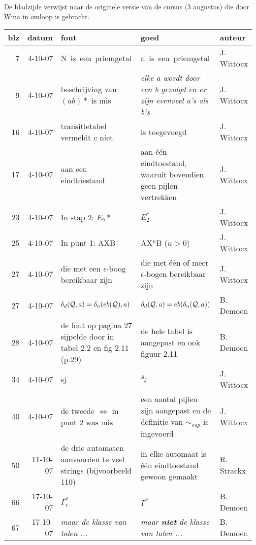 \documentclass[11pt]{fund}
\renewcommand{\thepage}{\hspace*{-3cm}\arabic{page}}
\begin{document}
\renewcommand{\thepage}{}


\renewcommand{\thepage}{\arabic{page}}
De bladzijde verwijst naar de originele versie van de cursus (3
augustus) die door Wina in omloop is gebracht.


\begin{tabular}{|r|r|p{6cm}|p{6cm}|p{2cm}|}
\hline
blz & datum    & fout & goed  & auteur \\ \hline
\hline
7 & 4-10-07 & N~is~een~priemgetal  & n~is~een~priemgetal  & J. Wittocx    \\
\hline
9 & 4-10-07 & beschrijving van $(ab)*$ is mis    & {\em elke a wordt door een b gevolgd en er zijn evenveel a's als b's}                     & J. Wittocx    \\
\hline
16 & 4-10-07 & transitietabel vermeldt c niet  &  is toegevoegd                     & J. Wittocx    \\
\hline
17 & 4-10-07 & aan een eindtoestand &  aan \'e\'en eindtoestand, waaruit bovendien geen pijlen vertrekken                    & J. Wittocx    \\
\hline
23 & 4-10-07 &  In stap 2: $E_2*$ &  $E_2^*$                       & J. Wittocx    \\
\hline
25 & 4-10-07 & In punt 1: AXB   & AX$^n$B ($n>0$)   & J. Wittocx    \\
\hline
27 & 4-10-07 & die met een $\epsilon$-boog bereikbaar zijn & die met \'{e}\'{e}n of meer $\epsilon$-bogen bereikbaar zijn & J. Wittocx    \\
\hline
27 & 4-10-07 & $\delta_d({\cal Q},a) = \delta_n(eb({\cal Q}),a)$  & $\delta_d({\cal Q},a) = eb(\delta_n({\cal Q},a))$  & B. Demoen    \\
\hline
28 & 4-10-07 & de fout op pagina 27 sijpelde door in tabel 2.2 en fig 2.11 (p.29) & de hele tabel is aangepast en ook figuur 2.11 & B. Demoen    \\
\hline
34 & 4-10-07 &  sj                    &   $s_j$                   & J. Wittocx    \\
\hline
40 & 4-10-07 &  de tweede $\Longleftrightarrow$ in punt 2 was mis  & een aantal pijlen zijn aangepast en de definitie van $\sim_{sup}$ is ingevoerd   & J. Wittocx    \\
\hline
50 & 11-10-07 & de drie automaten aanvaarden te veel strings (bijvoorbeeld 110)   & in elke automaat is \'{e}\'{e}n eindtoestand gewoon gemaakt & R. Strackx    \\ \hline
66 & 17-10-07  & $\Gamma_\epsilon^*$ & $\Gamma^*$ & B. Demoen \\ \hline
67 & 17-10-07 &     {\em maar de klasse van talen ...} &     {\em maar {\bf niet} de klasse van talen ...} & B. Demoen \\ \hline



\end{tabular}
\end{document}
